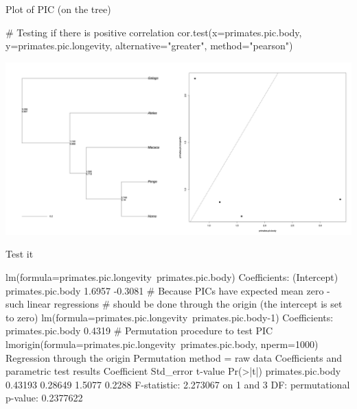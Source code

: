\documentclass[compress, ucs, xelatex, 11pt, xcolor=svgnames,
	hyperref={
		bookmarks=true,
		unicode=true,
		colorlinks=true,
		pdftitle={Molecular data in R},
		plainpages=false,
		pdfauthor={Vojtech Zeisek},
		pdfsubject={Course about phylogeny and evolution in R},
		pdfcreator={XeLaTeX},
		pdfkeywords={R, evolution, phylogeny, molecular data},
		linkcolor=Tomato,
		anchorcolor=SaddleBrown,
		citecolor=Goldenrod,
		filecolor=DarkMagenta,
		menucolor=Sienna,
		urlcolor=DarkTurquoise,
		pdftex},
	url={hyphens, lowtilde} %
	]{beamer}
\begin{document}
\begin{frame}[fragile]{Plot of PIC (on the tree)}
	\begin{spluscode}
    # Testing if there is positive correlation
    cor.test(x=primates.pic.body, y=primates.pic.longevity,
      alternative="greater", method="pearson")
	\end{spluscode}
	\includegraphics[width=\textwidth]{pic.png}
\end{frame}

\begin{frame}[fragile]{Test it}
	\label{pic-test}
	\begin{spluscode}
    lm(formula=primates.pic.longevity~primates.pic.body)
    Coefficients:
      (Intercept)  primates.pic.body
           1.6957            -0.3081
    # Because PICs have expected mean zero - such linear regressions
    # should be done through the origin (the intercept is set to zero)
    lm(formula=primates.pic.longevity~primates.pic.body-1)
    Coefficients:
    primates.pic.body
               0.4319
    # Permutation procedure to test PIC
    lmorigin(formula=primates.pic.longevity~primates.pic.body, nperm=1000)
    Regression through the origin
    Permutation method = raw data
    Coefficients and parametric test results
                       Coefficient Std_error t-value Pr(>|t|)
    primates.pic.body     0.43193   0.28649  1.5077   0.2288
    F-statistic: 2.273067 on 1 and 3 DF:
      permutational p-value: 0.2377622
	\end{spluscode}
\end{frame}
\end{document}
